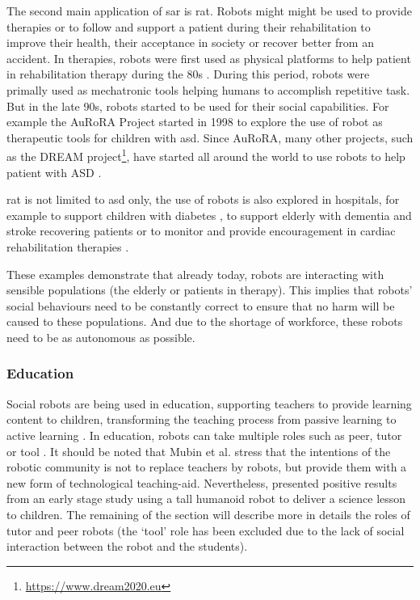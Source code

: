 	The second main application of \gls{sar} is \gls{rat}. Robots might might be used to provide therapies or to follow and support a patient during their rehabilitation to improve their health, their acceptance in society or recover better from an accident. In therapies, robots were first used as physical platforms to help patient in rehabilitation therapy during the 80s \citep{harwin1988robot}. During this period, robots were primally used as mechatronic tools helping humans to accomplish repetitive task. But in the late 90s, robots started to be used for their social capabilities. For example the AuRoRA Project \citep{dautenhahn1999robots} started in 1998 to explore the use of robot as therapeutic tools for children with \gls{asd}. Since AuRoRA, many other projects, such as the DREAM project\footnote{\url{https://www.dream2020.eu}}, have started all around the world to use robots to help patient with ASD \citep{diehl2012clinical,esteban2017build}. 
	
	\gls{rat} is not limited to \gls{asd} only, the use of robots is also explored in hospitals, for example to support children with diabetes \citep{belpaeme2012multimodal}, to support elderly with dementia \citep{wada2005psychological} and stroke recovering patients \citep{mataric2007socially} or to monitor and provide encouragement in cardiac rehabilitation therapies \citep{lara2017human}.	
	
	These examples demonstrate that already today, robots are interacting with sensible populations (the elderly or patients in therapy). This implies that robots' social behaviours need to be constantly correct to ensure that no harm will be caused to these populations. And due to the shortage of workforce, these robots need to be as autonomous as possible.
	
\subsubsection{Education} 
	Social robots are being used in education, supporting teachers to provide learning content to children, transforming the teaching process from passive learning to active learning \citep{linder2001facilitating}. In education, robots can take multiple roles such as peer, tutor or tool \citep{mubin2013review}. It should be noted that Mubin et al. stress that the intentions of the robotic community is not to replace teachers by robots, but provide them with a new form of technological teaching-aid. Nevertheless, \cite{verner2016science} presented positive results from an early stage study using a tall humanoid robot to deliver a science lesson to children. The remaining of the section will describe more in details the roles of tutor and peer robots (the `tool' role has been excluded due to the lack of social interaction between the robot and the students).
	
